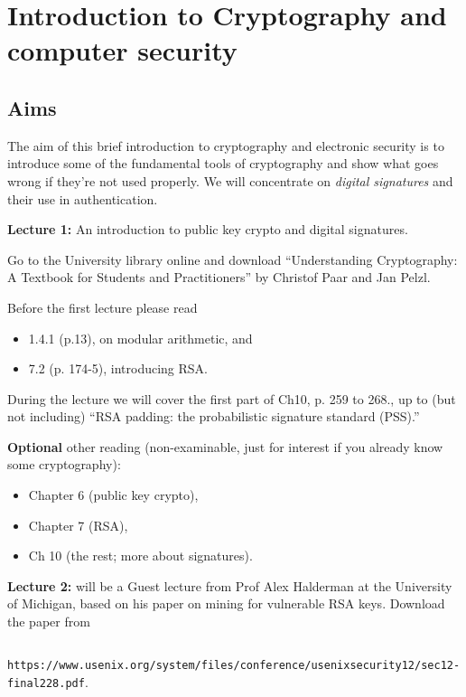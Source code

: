 \section{Introduction to Cryptography and computer security}

\subsection*{Aims}

The aim of this brief introduction to cryptography and electronic security is to introduce some of the fundamental tools of cryptography and show what goes wrong if they're not used properly.  We will concentrate on \emph{digital signatures} and their use in authentication.

{\bf Lecture 1:} An introduction to public key crypto and digital signatures.

Go to the University library online and download ``Understanding Cryptography: A Textbook for Students and Practitioners'' by 
Christof Paar and Jan Pelzl.

Before the first lecture please read 
\begin{itemize}
\item 1.4.1 (p.13), on modular arithmetic, and
\item 7.2 (p. 174-5), introducing RSA. 
\end{itemize}

During the lecture we will cover the first part of Ch10, p. 259 to 268., up to (but not including) ``RSA padding: the probabilistic signature standard (PSS).''
   
{\bf Optional } other reading (non-examinable, just for interest if you already know some cryptography): 
\begin{itemize}
\item Chapter 6 (public key crypto), 
\item Chapter 7 (RSA), 
\item Ch 10 (the rest; more about signatures).
\end{itemize}

{\bf Lecture 2:} will be a Guest lecture from Prof Alex Halderman at the University of Michigan, based on his paper on mining for vulnerable RSA keys.  Download the paper from 

{\small
\verb| https://www.usenix.org/system/files/conference/usenixsecurity12/sec12-final228.pdf|. }